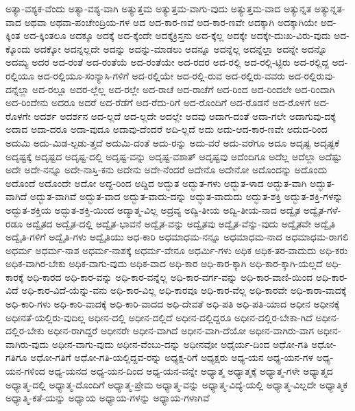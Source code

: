 {ಅತ್ಯಾ-ವಶ್ಯಕ-ವೆಂದು
ಅತ್ಯಾ-ವಶ್ಯ-ವಾಗಿ
ಅತ್ಯುತ್ತಮ
ಅತ್ಯುತ್ತಮ-ವಾಗು-ವುದು
ಅತ್ಯುತ್ತಮ-ವಾದ
ಅತ್ಯುನ್ನತ
ಅತ್ಯುನ್ನತ-ವಾದ
ಅಥವಾ
ಅಥವಾ-ಪಂಚೇಂದ್ರಿಯ-ಗಳ
ಅದ
ಅದ-ಕಾರ-ಣವೆ
ಅದ-ಕಾರ-ಣವೇ
ಅದಕ್ಕಾಗಿ
ಅದಕ್ಕಾಗಿಯೇ
ಅದ-ಕ್ಕಿಂತ
ಅದ-ಕ್ಕಿಂತಲೂ
ಅದಕ್ಕೂ
ಅದಕ್ಕೆ
ಅದ-ಕ್ಕೆಂದೇ
ಅದಕ್ಕೆಕ್ರಿಸ್ತನು
ಅದ-ಕ್ಕೆಲ್ಲ
ಅದಕ್ಕೇ
ಅದಕ್ಕೇ-ದುಃಖ-ವಿರು-ವುದು
ಅದ-ಕ್ಕೊಂದು
ಅದಕ್ಕೋ
ಅದನ್ನಲ್ಲದೇ
ಅದನ್ನು
ಅದನ್ನು-ಮಾಡಲು
ಅದನ್ನೂ
ಅದನ್ನೆಲ್ಲ
ಅದನ್ನೆಲ್ಲಾ
ಅದನ್ನೇ
ಅದನ್ನೊ
ಅದಮ್ಯ
ಅದರ
ಅದ-ರಂತೆ
ಅದ-ರಂತೆಯೆ
ಅದ-ರಂತೆಯೇ
ಅದ-ರದರ
ಅದ-ರಲ್ಲಿ
ಅದ-ರಲ್ಲಿ-ಟ್ಟಿರು
ಅದ-ರಲ್ಲಿದ್ದ
ಅದ-ರಲ್ಲಿಯೂ
ಅದ-ರಲ್ಲಿಯೂ-ಸಂನ್ಯಾಸಿ-ಗಳಿಗೆ
ಅದ-ರಲ್ಲಿಯೇ
ಅದ-ರಲ್ಲಿ-ರುವ
ಅದ-ರಲ್ಲಿರು-ವವರು
ಅದ-ರಲ್ಲಿರುವು-ದನ್ನೆಲ್ಲಾ
ಅದ-ರಲ್ಲೂ
ಅದರ-ಲ್ಲೆಲ್ಲ
ಅದ-ರಲ್ಲೇ
ಅದ-ರಾಚೆ
ಅದ-ರಾಚೆಗೆ
ಅದ-ರಿಂದ
ಅದ-ರಿಂದಲೇ
ಅದ-ರಿಂದಾಗಿ
ಅದ-ರಿಂದೇನು
ಅದರೂ
ಅದರೆ
ಅದ-ರೆಡೆಗೆ
ಅದ-ರೆದು-ರಿಗೆ
ಅದ-ರೊಂದಿಗೆ
ಅದ-ರೊಡನೆ
ಅದ-ರೊಳಗೆ
ಅದ-ರೊಳಗೇ
ಅದರ್ಶ
ಅದರ್ಶನ
ಅದ-ಲ್ಲದೆ
ಅದ-ಲ್ಲದೇ
ಅದಲ್ಲೇ
ಅದವು
ಅದಾಗ-ದಂತೆ
ಅದಾ-ಗಲೇ
ಅದಾಗುವು-ದಕ್ಕೆ
ಅದಾದ
ಅದಾ-ದರೂ
ಅದಾ-ವುದೂ
ಅದಾವು-ದೆಂದರೆ
ಅದಿ-ಲ್ಲದೆ
ಅದು
ಅದು-ಆದ-ಕಾರ-ಣವೇ
ಅದುದ-ರಿಂದ
ಅದುಮಿ
ಅದು-ಮಿಡ-ಲ್ಪಡು-ತ್ತದೆ
ಅದುಮಿ-ದಂತೆ
ಅದು-ರನ್ನು
ಅದು-ವರೆ
ಅದು-ವರೆಗೂ
ಅದೂ
ಅದೃಷ್ಟ
ಅದೃಷ್ಟಕೆ
ಅದೃಷ್ಟಕ್ಕೆ
ಅದೃಷ್ಟದ
ಅದೃಷ್ಟ-ದಲ್ಲಿ
ಅದೃಷ್ಟ-ವನ್ನು
ಅದೃಷ್ಟ-ವಶಾತ್
ಅದೃಷ್ಟವು
ಅದೆಂದಿಗೂ
ಅದೆಲ್ಲ
ಅದೆಲ್ಲಾ
ಅದೆಷ್ಟು
ಅದೇ
ಅದೇ-ನನ್ನೂ
ಅದೇ-ನಾಸ್ತಿ-ಕನು
ಅದೇನು
ಅದೇ-ನೆಂದರೆ
ಅದೇನೊ
ಅದೇನೋ
ಅದೊಂದನ್ನು
ಅದೊಂದು
ಅದೊಂದೆ
ಅದೊಂದೇ
ಅದೋ
ಅದ್ದ-ರಿಂದ
ಅದ್ದಿದ
ಅದ್ಭುತ
ಅದ್ಭುತ-ಗಳು
ಅದ್ಭುತ-ಳಾದ
ಅದ್ಭುತ-ವಾಗಿ
ಅದ್ಭುತ-ವಾಗಿದೆ
ಅದ್ಭುತ-ವಾಗಿವೆ
ಅದ್ಭುತ-ವಾದ
ಅದ್ಭುತ-ವಾದು-ದನ್ನು
ಅದ್ಭುತ-ವಾದುದು
ಅದ್ಭುತ-ಶಕ್ತಿ
ಅದ್ಭುತ-ಶಕ್ತಿ-ಗಳನ್ನು
ಅದ್ಭುತ-ಶಕ್ತಿಯ
ಅದ್ಭುತ-ಶಕ್ತಿ-ಯಿಂದ
ಅದ್ಯಾತ್ಮ-ವಿಲ್ಲ
ಅದ್ರವ್ಯ
ಅದ್ವಿ-ತೀಯ
ಅದ್ವಿ-ತೀಯ-ನಾದ
ಅದ್ವೈತ
ಅದ್ವೈತ-ಗಳೆ-ರಡೂ
ಅದ್ವೈತದ
ಅದ್ವೈತ-ದಲ್ಲಿ
ಅದ್ವೈತ-ಭಾವನೆ
ಅದ್ವೈತ-ವನ್ನು
ಅದ್ವೈತವು
ಅದ್ವೈತ-ವೆನ್ನು-ವುದು
ಅದ್ವೈತವೇ
ಅದ್ವೈತಿ
ಅದ್ವೈತಿ-ಗಳಿಗೆ
ಅದ್ವೈತಿ-ಗಳು
ಅದ್ವೈತಿಯು
ಅಧ-ಕಾರಿ
ಅಧಮಾಧಮ-ನನ್ನೂ
ಅಧಮಾಧಮ-ನಾದ
ಅಧಮಾಧಮ-ರಾಗಲಿ
ಅಧರ್ಮ
ಅಧರ್ಮ-ನಾಶ
ಅಧರ್ಮ-ನಾಶಕ್ಕೆ
ಅಧರ್ಮ-ವೇನೂ
ಅಧರ್ಮಿ-ಗಳು
ಅಧಿಕ
ಅಧಿಕ-ತರ-ವಾದುದು
ಅಧಿ-ಕರು
ಅಧಿಕ-ವಾಗಿರ-ಬೇಕು
ಅಧಿಕ-ವಾಗು-ವುದು
ಅಧಿಕ-ವಾದ
ಅಧಿ-ಕಾರ
ಅಧಿ-ಕಾರ-ಕ್ಕಾಗಿ
ಅಧಿ-ಕಾರ-ಕ್ಕಾಗಿ-ಯಲ್ಲದೆ
ಅಧಿ-ಕಾರಕ್ಕೆ
ಅಧಿ-ಕಾರದ
ಅಧಿ-ಕಾರ-ವನ್ನು
ಅಧಿ-ಕಾರ-ವನ್ನೆಲ್ಲ
ಅಧಿ-ಕಾರ-ವರ್ಗ-ವನ್ನು
ಅಧಿ-ಕಾರ-ವಾಣಿ-ಯಿಂದ
ಅಧಿ-ಕಾರ-ವಿದೆ
ಅಧಿ-ಕಾರ-ವಿದೆ-ಯೆನ್ನು-ವನು
ಅಧಿ-ಕಾರ-ವಿಲ್ಲ
ಅಧಿ-ಕಾರವೂ
ಅಧಿ-ಕಾರ-ವೆಲ್ಲ
ಅಧಿ-ಕಾರವೇ
ಅಧಿ-ಕಾರಾ-ವಾದಕ್ಕೆ
ಅಧಿ-ಕಾರಿ-ಗಳು
ಅಧಿ-ಕಾರಿ-ವಾದಕ್ಕೆ
ಅಧಿ-ಕಾರಿ-ವಾದದ
ಅಧಿ-ದೇವತೆ
ಅಧಿ-ಪತಿ
ಅಧಿ-ಪತಿ-ಯಾದ
ಅಧೀನ
ಅಧೀನಕ್ಕೆ
ಅಧೀನತೆ-ಯಲ್ಲಿರು-ವುದಿಲ್ಲ
ಅಧೀನ-ದಲ್ಲಿ
ಅಧೀನ-ದಲ್ಲಿದೆ
ಅಧೀನ-ದಲ್ಲಿದ್ದರೂ
ಅಧೀನ-ದಲ್ಲಿರ-ಬೇಕಾ-ಗಿದೆ
ಅಧೀನ-ದಲ್ಲಿರ-ಬೇಕು
ಅಧೀನ-ರಾಗಿದ್ದರೆ
ಅಧೀನರೇ
ಅಧೀನ-ವಾಗಿದೆ
ಅಧೀನ-ವಾಗಿ-ದೆಯೋ
ಅಧೀನ-ವಾಗಿರು-ವಾಗ
ಅಧೀನ-ವಾಗಿರು-ವುದು
ಅಧೀನ-ವಾಗು-ವುದು
ಅಧೀನ-ವೆಂಬು-ದನ್ನು
ಅಧೀನವೋ
ಅಧೈರ್ಯ-ದಿಂದ
ಅಧೋ-ಗತಿ
ಅಧೋ-ಗತಿಗೂ
ಅಧೋ-ಗತಿಗೆ
ಅಧೋ-ಗತಿ-ಯಲ್ಲಿದ್ದವ-ರನ್ನು
ಅಧ್ಯಕ್ಷ-ರಿಗೆ
ಅಧ್ಯಕ್ಷರು
ಅಧ್ಯ-ಯನ
ಅಧ್ಯ-ಯನ-ಗಳ
ಅಧ್ಯ-ಯನ-ಗಳಿಂದ
ಅಧ್ಯ-ಯನದ
ಅಧ್ಯ-ಯನ-ದಿಂದ
ಅಧ್ಯ-ಯನ-ವನ್ನೇ
ಅಧ್ಯಾತ್ಮ
ಅಧ್ಯಾತ್ಮಕ್ಕೆ
ಅಧ್ಯಾತ್ಮ-ಗಳೇ
ಅಧ್ಯಾತ್ಮದ
ಅಧ್ಯಾತ್ಮ-ದಲ್ಲಿ
ಅಧ್ಯಾತ್ಮ-ದೊಂದಿಗೆ
ಅಧ್ಯಾತ್ಮ-ಪ್ರೇಮ
ಅಧ್ಯಾತ್ಮ-ವನ್ನು
ಅಧ್ಯಾತ್ಮ-ವಿದ್ಯೆ-ಯಲ್ಲಿ
ಅಧ್ಯಾತ್ಮ-ವಿಲ್ಲದೇ
ಅಧ್ಯಾತ್ಮಿಕ
ಅಧ್ಯಾತ್ಮಿ-ಕತೆ-ಯನ್ನು
ಅಧ್ಯಾಯ
ಅಧ್ಯಾಯ-ಗಳನ್ನು
ಅಧ್ಯಾಯ-ಗಳಾಗಿವೆ
}
